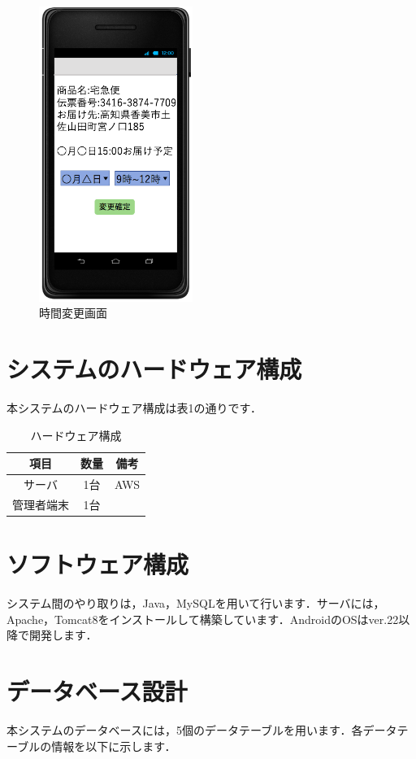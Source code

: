\documentclass[a4j,titlepage]{jarticle}
\begin{document}
\begin{figure}[H]
 \begin{center}
  \includegraphics[width=50mm]{time_change.png}
	\caption{時間変更画面}
	\label{fig:time_change}
 \end{center}

\end{figure}
\newpage
\section{システムのハードウェア構成}
本システムのハードウェア構成は表1の通りです．
\begin{table}[H]
\begin{center}
 \caption{ハードウェア構成}
  \begin{tabular}{|c|c|c|}\hline
    項目 & 数量 & 備考\\ \hline \hline
    サーバ & 1台 & AWS\\ \hline
    管理者端末 & 1台 & \\ \hline
  \end{tabular}
\end{center}
\end{table}


\section{ソフトウェア構成}
システム間のやり取りは，Java，MySQLを用いて行います．サーバには，Apache，Tomcat8をインストールして構築しています．AndroidのOSはver.22以降で開発します．

\section{データベース設計}
本システムのデータベースには，5個のデータテーブルを用います．各データテーブルの情報を以下に示します．
\end{document}
